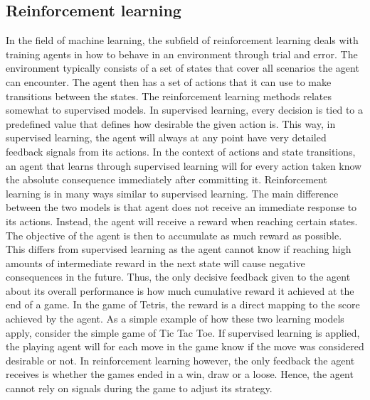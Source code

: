 \subsection{Reinforcement learning \label{RL}}

In the field of machine learning, the subfield of reinforcement learning
deals with training agents in how to behave in an environment through
trial and error. The environment typically consists of a set of states that cover all
scenarios the agent can encounter. The agent then has a set of actions
that it can use to make transitions between the states. 
The reinforcement learning methods relates somewhat 
to supervised models.
In supervised learning, every decision is tied to a predefined value
that defines how desirable the given action is. This way, in supervised learning,
the agent will always at any point have very detailed feedback signals from its actions.
In the context of actions and state transitions, an agent that learns through
supervised learning will for every action taken know the absolute consequence
immediately after committing it.
Reinforcement learning is in many ways similar to supervised learning. 
The main difference between the two models is that agent does not receive 
an immediate response to its actions. Instead, the agent will receive a reward
when reaching certain states. The objective of the agent is then to
accumulate as much reward as possible. This differs from supervised learning
as the agent cannot know if reaching high amounts of intermediate reward in the next state
will cause negative consequences in the future. Thus, the only decisive 
feedback given to the agent about its overall performance is 
how much cumulative reward it achieved at the end of a game.
In the game of Tetris, the reward is a direct mapping to 
the score achieved by the agent.
As a simple example of how these two learning models apply, consider 
the simple game of
Tic Tac Toe. If supervised learning
is applied, the playing agent will for each move in the game know
if the move was considered desirable or not. 
In reinforcement learning however, the only feedback the agent receives
is whether the games ended in a win, draw or a loose. Hence, the agent
cannot rely on signals during the game to adjust its strategy.



